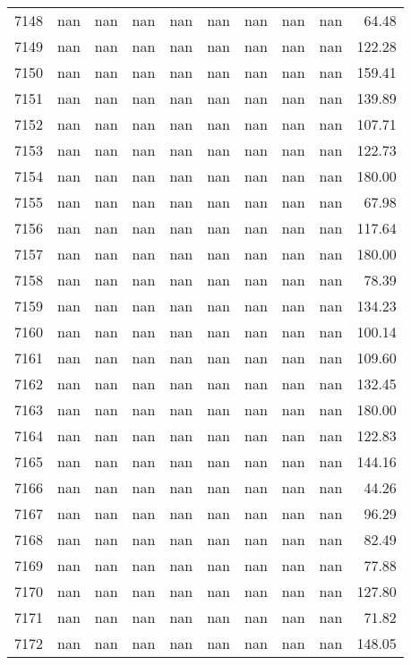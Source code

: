 \begin{tabular}{lrrrrrrrrr}
7148 & nan & nan & nan & nan & nan & nan & nan & nan & 64.48 \\
7149 & nan & nan & nan & nan & nan & nan & nan & nan & 122.28 \\
7150 & nan & nan & nan & nan & nan & nan & nan & nan & 159.41 \\
7151 & nan & nan & nan & nan & nan & nan & nan & nan & 139.89 \\
7152 & nan & nan & nan & nan & nan & nan & nan & nan & 107.71 \\
7153 & nan & nan & nan & nan & nan & nan & nan & nan & 122.73 \\
7154 & nan & nan & nan & nan & nan & nan & nan & nan & 180.00 \\
7155 & nan & nan & nan & nan & nan & nan & nan & nan & 67.98 \\
7156 & nan & nan & nan & nan & nan & nan & nan & nan & 117.64 \\
7157 & nan & nan & nan & nan & nan & nan & nan & nan & 180.00 \\
7158 & nan & nan & nan & nan & nan & nan & nan & nan & 78.39 \\
7159 & nan & nan & nan & nan & nan & nan & nan & nan & 134.23 \\
7160 & nan & nan & nan & nan & nan & nan & nan & nan & 100.14 \\
7161 & nan & nan & nan & nan & nan & nan & nan & nan & 109.60 \\
7162 & nan & nan & nan & nan & nan & nan & nan & nan & 132.45 \\
7163 & nan & nan & nan & nan & nan & nan & nan & nan & 180.00 \\
7164 & nan & nan & nan & nan & nan & nan & nan & nan & 122.83 \\
7165 & nan & nan & nan & nan & nan & nan & nan & nan & 144.16 \\
7166 & nan & nan & nan & nan & nan & nan & nan & nan & 44.26 \\
7167 & nan & nan & nan & nan & nan & nan & nan & nan & 96.29 \\
7168 & nan & nan & nan & nan & nan & nan & nan & nan & 82.49 \\
7169 & nan & nan & nan & nan & nan & nan & nan & nan & 77.88 \\
7170 & nan & nan & nan & nan & nan & nan & nan & nan & 127.80 \\
7171 & nan & nan & nan & nan & nan & nan & nan & nan & 71.82 \\
7172 & nan & nan & nan & nan & nan & nan & nan & nan & 148.05 \\

\end{tabular}
